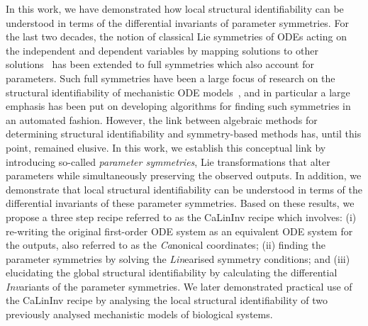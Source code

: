 \documentclass[12pt]{article}
\begin{document}
In this work, we have demonstrated how local structural identifiability can be understood in terms of the differential invariants of parameter symmetries. For the last two decades, the notion of classical Lie symmetries of ODEs acting on the independent and dependent variables by mapping solutions to other solutions~\cite{bluman1989symmetries,hydon2000symmetry,olver2000applications,stephani1989differential} has been extended to full symmetries which also account for parameters. Such full symmetries have been a large focus of research on the structural identifiability of mechanistic ODE models~\cite{yates2009structural,merkt2015higher,massonis2020finding,castro2020structuralIdentifiability,villaverde2022symmetries}, and in particular a large emphasis has been put on developing algorithms for finding such symmetries in an automated fashion. However, the link between algebraic methods for determining structural identifiability and symmetry-based methods has, until this point, remained elusive. In this work, we establish this conceptual link by introducing so-called \textit{parameter symmetries}, Lie transformations that alter parameters while simultaneously preserving the observed outputs. In addition, we demonstrate that local structural identifiability can be understood in terms of the differential invariants of these parameter symmetries. Based on these results, we propose a three step recipe referred to as the CaLinInv recipe which involves: (i) re-writing the original first-order ODE system as an equivalent ODE system for the outputs, also referred to as the \textit{Ca}nonical coordinates; (ii) finding the parameter symmetries by solving the \textit{Lin}earised symmetry conditions; and (iii) elucidating the global structural identifiability by calculating the differential \textit{Inv}ariants of the parameter symmetries. We later demonstrated practical use of the CaLinInv recipe by analysing the local structural identifiability of two previously analysed mechanistic models of biological systems. 
\end{document}
